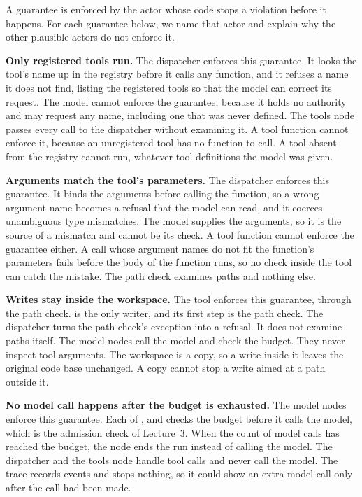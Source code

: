 A guarantee is enforced by the actor whose code stops a violation before it happens. For each
guarantee below, we name that actor and explain why the other plausible actors do not enforce it.
\bi
\item \textbf{Only registered tools run.} The dispatcher enforces this guarantee. It looks the
tool's name up in the registry before it calls any function, and it refuses a name it does not
find, listing the registered tools so that the model can correct its request. The model cannot
enforce the guarantee, because it holds no authority and may request any name, including one that
was never defined. The tools node passes every call to the dispatcher without examining it. A tool
function cannot enforce it, because an unregistered tool has no function to call. A tool absent
from the registry cannot run, whatever tool definitions the model was given.
\item \textbf{Arguments match the tool's parameters.} The dispatcher enforces this guarantee. It
binds the arguments before calling the function, so a wrong argument name becomes a refusal that the
model can read, and it coerces unambiguous type mismatches. The model supplies the arguments, so it
is the source of a mismatch and cannot be its check. A tool function cannot enforce the guarantee
either. A call whose argument names do not fit the function's parameters fails before the body of
the function runs, so no check inside the tool can catch the mistake. The path check examines paths
and nothing else.
\item \textbf{Writes stay inside the workspace.} The  tool enforces this guarantee,
through the path check.  is the only writer, and its first step is the path check. The
dispatcher turns the path check's exception into a refusal. It does not examine paths itself. The
model nodes call the model and check the budget. They never inspect tool arguments. The
workspace is a copy, so a write inside it leaves the original code base unchanged. A copy cannot
stop a write aimed at a path outside it.
\item \textbf{No model call happens after the budget is exhausted.} The model nodes enforce this
guarantee. Each of ,  and  checks the budget
before it calls the model, which is the admission check of Lecture~3. When the count of model calls
has reached the budget, the node ends the run instead of calling the model. The dispatcher and the
tools node handle tool calls and never call the model. The trace records events and stops nothing,
so it could show an extra model call only after the call had been made.
\ei

